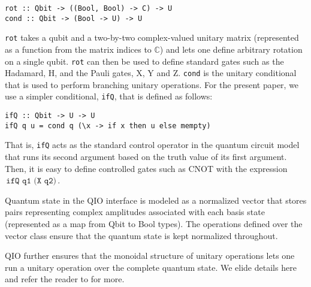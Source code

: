 \documentclass[acmsmall,nonacm,timestamp,review=false,anonymous=false]{acmart}
\newcommand{\kw}[1]{\,\mathrm{\texttt{#1}}\,}
\begin{document}
\begin{minipage}{0.95\linewidth}
\begin{lstlisting}[language=QHaskell]
rot :: Qbit -> ((Bool, Bool) -> C) -> U
cond :: Qbit -> (Bool -> U) -> U
\end{lstlisting}
\end{minipage}

\texttt{rot} takes a qubit and a two-by-two complex-valued unitary matrix (represented as a function from the matrix indices to $\mathbb{C}$) and lets one define arbitrary rotation on a single qubit. \texttt{rot} can then be used to define standard gates such as the Hadamard, H, and the Pauli gates, X, Y and Z. \texttt{cond} is the unitary conditional that is used to perform branching unitary operations. For the present paper, we use a simpler conditional, \texttt{ifQ}, that is defined as follows:

\begin{minipage}{0.95\linewidth}
\begin{lstlisting}[language=QHaskell]
ifQ :: Qbit -> U -> U
ifQ q u = cond q (\x -> if x then u else mempty)
\end{lstlisting}
\end{minipage}

That is, \texttt{ifQ} acts as the standard control operator in the quantum circuit model that runs its second argument based on the truth value of its first argument. Then, it is easy to define controlled gates such as CNOT with the expression $\kw{ifQ q1 (X q2)}$.

Quantum state in the QIO interface is modeled as a normalized vector that stores pairs representing complex amplitudes associated with each basis state (represented as a map from Qbit to Bool types). The operations defined over the vector class ensure that the quantum state is kept normalized throughout.

QIO further ensures that the monoidal structure of unitary operations lets one run a unitary operation over the complete quantum state. We elide details here and refer the reader to \cite{qio} for more.

%
\end{document}
